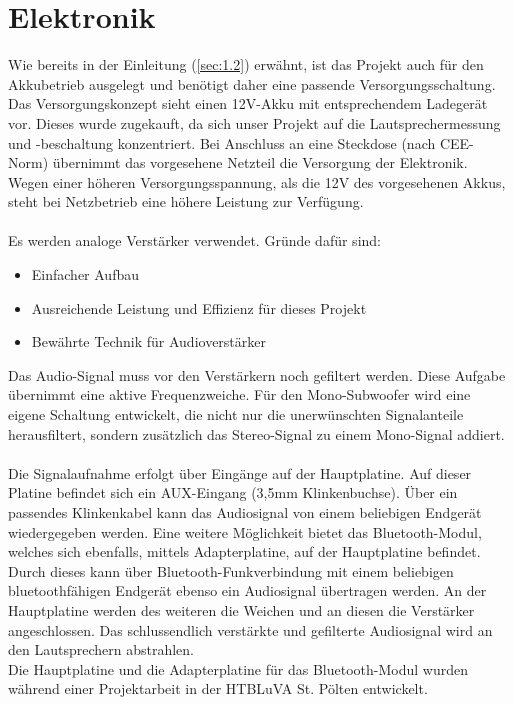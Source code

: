 \section{Elektronik}\label{subsec:2.1.1}
Wie bereits in der Einleitung (\ref{sec:1.2}) erwähnt, ist das Projekt auch für den Akkubetrieb ausgelegt und benötigt daher eine passende Versorgungsschaltung.
Das Versorgungskonzept sieht einen 12V-Akku mit entsprechendem Ladegerät vor.
Dieses wurde zugekauft, da sich unser Projekt auf die Lautsprechermessung und -beschaltung konzentriert.
Bei Anschluss an eine Steckdose (nach CEE-Norm) übernimmt das vorgesehene Netzteil die Versorgung der Elektronik.
Wegen einer höheren Versorgungsspannung, als die 12V des vorgesehenen Akkus, steht bei Netzbetrieb eine höhere Leistung zur Verfügung. \\ \\
Es werden analoge Verstärker verwendet.
Gründe dafür sind:
\begin{itemize}
	\item Einfacher Aufbau
	\item Ausreichende Leistung und Effizienz für dieses Projekt
	\item Bewährte Technik für Audioverstärker
\end{itemize} 
Das Audio-Signal muss vor den Verstärkern noch gefiltert werden.
Diese Aufgabe übernimmt eine aktive Frequenzweiche.
Für den Mono-Subwoofer wird eine eigene Schaltung entwickelt, die nicht nur die unerwünschten Signalanteile herausfiltert, sondern zusätzlich das Stereo-Signal zu einem Mono-Signal addiert.\\ \\
Die Signalaufnahme erfolgt über Eingänge auf der Hauptplatine.
Auf dieser Platine befindet sich ein AUX-Eingang (3,5mm Klinkenbuchse).
Über ein passendes Klinkenkabel kann das Audiosignal von einem beliebigen Endgerät wiedergegeben werden.
Eine weitere Möglichkeit bietet das Bluetooth-Modul, welches sich ebenfalls, mittels Adapterplatine, auf der Hauptplatine befindet.
Durch dieses kann über Bluetooth-Funkverbindung mit einem beliebigen bluetoothfähigen Endgerät ebenso ein Audiosignal übertragen werden.
An der Hauptplatine werden des weiteren die Weichen und an diesen die Verstärker angeschlossen. 
Das schlussendlich verstärkte und gefilterte Audiosignal wird an den Lautsprechern abstrahlen.\\
Die Hauptplatine und die Adapterplatine für das Bluetooth-Modul wurden während einer Projektarbeit in der HTBLuVA St. Pölten entwickelt.

